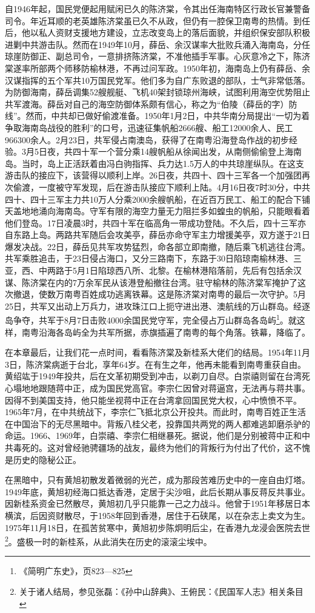 自1946年起，国民党便起用赋闲已久的陈济棠，令其出任海南特区行政长官兼警备司令。年近耳顺的老英雄陈济棠虽已久不从政，但仍有一腔保卫南粤的热情。到任后，他以私人资财支援地方建设，立志改变岛上的落后面貌，并组织保安部队积极进剿中共游击队。然而在1949年10月，薛岳、余汉谋率大批败兵涌入海南岛，分任琼崖防御正、副总司令，一意排挤陈济棠，不准他插手军事。心灰意冷之下，陈济棠遂率所部两个师移防榆林港，不再过问军政。1950年初，海南岛上仍有薛岳、余汉谋指挥的五个军共10万国民党军。他们多为自广东败退的部队，士气非常低落。为防御海南，薛岳调集52艘舰艇、飞机40架封锁琼州海峡，试图利用海空优势阻止共军渡海。薛岳对自己的海空防御体系颇有信心，称之为“伯陵（薛岳的字）防线”。然而，中共却已做好偷渡准备。1950年1月2日，中共华南分局提出“一切为着争取海南岛战役的胜利”的口号，迅速征集帆船2666艘、船工12000余人、民工966300余人。2月23日，共军侵占南澳岛，获得了在南粤沿海登岛作战的初步经验。3月5日夜，共四十军一个营分乘14艘帆船从徐闻出发，从南侧偷偷登上海南岛。当时，岛上正活跃着由冯白驹指挥、兵力达1.5万人的中共琼崖纵队。在这支游击队的接应下，该营得以顺利上岸。26日夜，共四十、四十三军各一个加强团再次偷渡，一度被守军发现，后在游击队接应下顺利上陆。4月16日夜7时30分，中共四十、四十三军主力共10万人分乘2000余艘帆船，在近百万民工、船工的配合下铺天盖地地涌向海南岛。守军有限的海空力量无力阻拦多如蝗虫的帆船，只能眼看着他们登岛。17日凌晨3时，共四十军在临高角一带成功登陆。不久后，四十三军亦自东路上岛。两路共军随后会攻美亭，薛岳亦命守军主力增援美亭，双方遂于21日爆发决战。22日，薛岳见共军攻势猛烈，命各部立即南撤，随后乘飞机逃往台湾。共军乘胜追击，于23日侵占海口，又分三路南下，东路于30日陷琼南榆林港、三亚，西、中两路于5月1日陷琼西八所、北黎。在榆林港陷落前，先后有包括余汉谋、陈济棠在内的7万余军民从该港登船撤往台湾。驻守榆林的陈济棠军掩护了这次撤退，使数万南粤百姓成功逃离铁幕。这是陈济棠对南粤的最后一次守护。5月25日，共军又出动上万兵力，进攻珠江口上扼守进出港、澳航线的万山群岛。经逐岛争夺，共军于8月7日击败4000余国民党守军，完全侵占万山群岛各岛屿\footnote{《简明广东史》，页823—825}。就这样，南粤沿海各岛屿全为共军所据，赤旗插遍了南粤的每个角落。铁幕，降临了。

在本章最后，让我们花一点时间，看看陈济棠及新桂系大佬们的结局。1954年11月3日，陈济棠病逝于台北，享年64岁。在有生之年，他再未能看到南粤重获自由。黄绍竑于1949年投共，后在文革初期受到冲击，以剃刀自尽。白崇禧则留在台湾死心塌地地跟随蒋中正，成为国民党高官。李宗仁因曾对蒋逼宫，无法再与蒋共事。因得不到美国支持，他只能坐视蒋中正在台湾拿回国民党大权，心中愤愤不平。1965年7月，在中共统战下，李宗仁飞抵北京公开投共。而此时，南粤百姓正生活在中国治下的无尽黑暗中。背叛八桂父老，投靠国共两党的两人都难逃卸磨杀驴的命运。1966、1969年，白崇禧、李宗仁相继暴死。据说，他们是分别被蒋中正和中共毒死的。这对曾经驰骋疆场的战友，最终为他们的背叛行为付出了代价，这不愧是历史的隐秘公正。

在黑暗中，只有黄旭初散发着微弱的光芒，成为那段苦难历史中的一座自由灯塔。1949年底，黄旭初经海口抵达香港，定居于尖沙咀，此后长期从事反蒋反共事业。因新桂系资金已然散尽，黄旭初几乎只能靠一己之力战斗。他曾于1951年移居日本横滨，后因资财散尽，于1958年回到香港，居住于石硖尾，以在杂志上卖文为生。1975年11月18日，在孤苦贫寒中，黄旭初步陈炯明后尘，在香港九龙浸会医院去世\footnote{关于诸人结局，参见张磊：《孙中山辞典》、王俯民：《民国军人志》相关条目}。盛极一时的新桂系，从此消失在历史的滚滚尘埃中。











